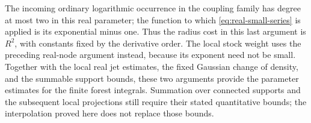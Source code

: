 The incoming ordinary logarithmic occurrence in the coupling family
has degree at most two in this real parameter; the function to which
\eqref{eq:real-small-series} is applied is its exponential minus
one. Thus the radius cost in this
last argument is $R^2$, with constants fixed by the derivative
order. The local stock weight uses the preceding real-node
argument instead, because its exponent need not be small.
Together with the local real jet estimates, the fixed Gaussian
change of density, and the summable support bounds, these two
arguments provide the parameter estimates for the finite forest
integrals. Summation over connected supports and the subsequent
local projections still require their stated quantitative bounds;
the interpolation proved here does not replace those bounds.
